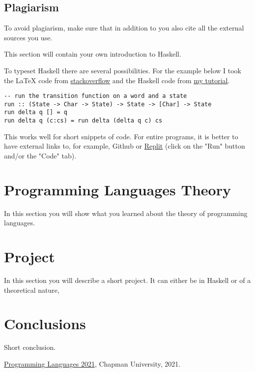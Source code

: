 \documentclass{article}
\begin{document}
\subsection{Plagiarism}

To avoid plagiarism, make sure that in addition to \cite{PL} you also cite all the external sources you use.

This section will contain your own introduction to Haskell. 

\medskip\noindent
To typeset Haskell there are several possibilities. For the example below I took the LaTeX code from \href{https://stackoverflow.com/a/3175141/4600290}{stackoverflow} and the Haskell code from \href{https://hackmd.io/@alexhkurz/HylLKujCP}{my tutorial}.

\begin{lstlisting}
-- run the transition function on a word and a state
run :: (State -> Char -> State) -> State -> [Char] -> State
run delta q [] = q
run delta q (c:cs) = run delta (delta q c) cs 
\end{lstlisting}

\medskip\noindent
This works well for short snippets of code. For entire programs, it is better to have external links to, for example, Github or \href{https://replit.com/@alexhkurz/automata01#main.hs}{Replit} (click on the "Run" button and/or the "Code" tab).

\section{Programming Languages Theory}

In this section you will show what you learned about the theory of programming languages. 

\section{Project}

In this section you will describe a short project. It can either be in Haskell or of a theoretical nature,

\section{Conclusions}\label{conclusions}
Short conclusion. 

\begin{thebibliography}{99}
 \href{https://github.com/alexhkurz/programming-languages-2021/blob/main/README.md}{Programming Languages 2021}, Chapman University, 2021.
\end{thebibliography}
\end{document}
